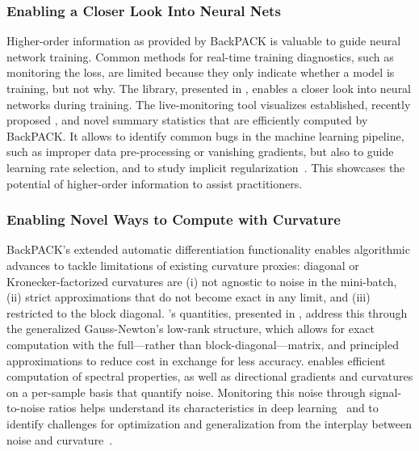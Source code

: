 \subsubsection{Enabling a Closer Look Into Neural Nets}
Higher-order information as provided by BackPACK is valuable to guide neural
network training. Common methods for real-time training diagnostics, such as
monitoring the loss, are limited because they only indicate whether a model is
training, but not why. The \cockpit library, presented in ,
enables a closer look into neural networks during training. The live-monitoring
tool visualizes established, recently proposed
\cite{mahsereci2017early,balles2017coupling,byrd2012sample,bollapragada2017adaptive,yao2020pyhessian,thomas2020interplay,liu2020understanding},
and novel summary statistics that are efficiently computed by BackPACK. It
allows to identify common bugs in the machine learning pipeline, such as
improper data pre-processing or vanishing gradients, but also to guide learning
rate selection, and to study implicit
regularization~\cite{mulayoff2020unique,ginsburg2020regularization}. This
showcases the potential of higher-order information to assist practitioners.

\subsubsection{Enabling Novel Ways to Compute with Curvature}

BackPACK's extended automatic differentiation functionality enables algorithmic
advances to tackle limitations of existing curvature proxies: diagonal or
Kronecker-factorized curvatures are (i) not agnostic to noise in the mini-batch,
(ii) strict approximations that do not become exact in any limit, and (iii)
restricted to the block diagonal. \vivit's quantities, presented in
, address this through the generalized Gauss-Newton's low-rank
structure, which allows for exact computation with the full---rather than
block-diagonal---matrix, and principled approximations to reduce cost in
exchange for less accuracy. \vivit enables efficient computation of spectral
properties, as well as directional gradients and curvatures on a per-sample
basis that quantify noise. Monitoring this noise through signal-to-noise ratios
helps understand its characteristics in deep learning~\cite{faghri2020study} and
to identify challenges for optimization and generalization from the interplay
between noise and curvature~\cite{thomas2020interplay}.

